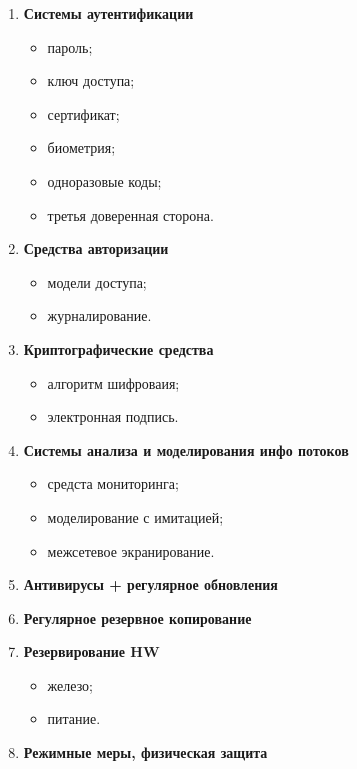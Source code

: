 \begin{enumerate}
    \item \textbf{Системы аутентификации}

        \begin{itemize}
            \item пароль;
            \item ключ доступа;
            \item сертификат;
            \item биометрия;
            \item одноразовые коды;
            \item третья доверенная сторона.
        \end{itemize}

    \item \textbf{Средства авторизации}

        \begin{itemize}
            \item модели доступа;
            \item журналирование.
        \end{itemize}

    \item \textbf{Криптографические средства}

        \begin{itemize}
            \item алгоритм шифроваия;
            \item электронная подпись.
        \end{itemize}

    \item \textbf{Системы анализа и моделирования инфо потоков}

        \begin{itemize}
            \item средста мониторинга;
            \item моделирование с имитацией;
            \item межсетевое экранирование.
        \end{itemize}

    \item \textbf{Антивирусы + регулярное обновления}

    \item \textbf{Регулярное резервное копирование}

    \item \textbf{Резервирование HW}

        \begin{itemize}
            \item железо;
            \item питание.
        \end{itemize}

    \item \textbf{Режимные меры, физическая защита}
\end{enumerate}
